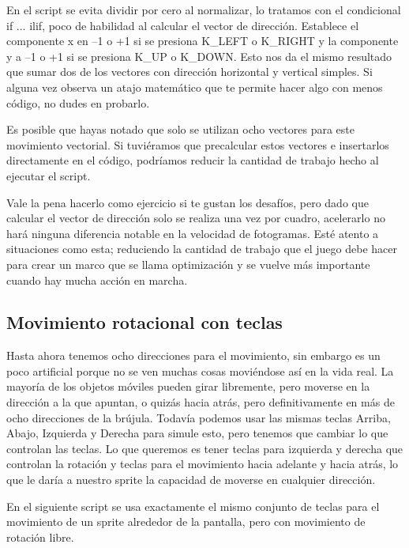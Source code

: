 {En el script se evita dividir por cero al normalizar, lo tratamos con el condicional  {\ttfamily if ... ilif}, poco de habilidad al calcular el vector de dirección. Establece el componente x en –1 o +1 si se presiona  {\ttfamily K\_LEFT} o  {\ttfamily K\_RIGHT} y la componente y a –1 o +1 si se presiona {\ttfamily K\_UP} o  {\ttfamily K\_DOWN}. Esto nos da el mismo resultado que sumar dos de los vectores con dirección  horizontal y vertical simples. Si alguna vez observa  un atajo matemático que te permite hacer algo con menos código, no dudes en probarlo. 

Es posible que hayas notado que solo se utilizan ocho vectores para este movimiento vectorial. Si tuviéramos que
precalcular estos vectores e insertarlos directamente en el código, podríamos reducir la cantidad de trabajo
hecho al ejecutar el script.

Vale la pena hacerlo como ejercicio si te gustan los desafíos, pero dado que calcular
el vector de dirección solo se realiza una vez por cuadro, acelerarlo no hará ninguna diferencia notable en la velocidad 
de fotogramas. Esté atento a situaciones como esta; reduciendo la cantidad de trabajo que el juego debe hacer para
crear un marco que se llama optimización y se vuelve más importante cuando hay mucha acción en marcha.

\subsection{Movimiento rotacional con teclas}

Hasta ahora tenemos ocho direcciones para  el movimiento, sin embargo es un poco artificial porque no se ven muchas cosas moviéndose
así en la vida real. La mayoría de los objetos móviles pueden girar libremente, pero moverse en la dirección a la que apuntan,
o quizás hacia atrás, pero definitivamente en más de ocho direcciones de la brújula. Todavía podemos usar las mismas teclas Arriba, Abajo, Izquierda y Derecha para simule esto, pero tenemos que cambiar lo que controlan las teclas. 
Lo que queremos es tener teclas para izquierda y derecha que controlan la rotación y teclas para el movimiento hacia adelante
y hacia atrás, lo que le daría a nuestro sprite la capacidad de moverse en cualquier dirección. 

En el siguiente script se usa exactamente el mismo conjunto de teclas para el movimiento de un sprite alrededor de la pantalla, pero con movimiento de rotación libre. 


}
